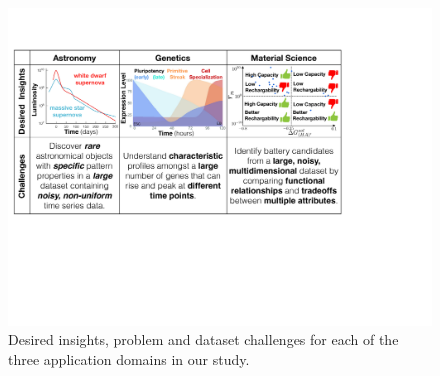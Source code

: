  \begin{figure}[ht!]
  \centering
  \includegraphics[width=\linewidth]{figures/science_goal.pdf}
  \caption{Desired insights, problem and dataset challenges for each of the three application domains in our study.}
  \label{science_goal}
  \vspace*{-15pt}
 \end{figure}
